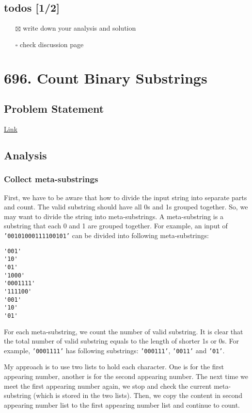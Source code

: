 \documentclass[12pt]{article}
\begin{document}
\subsection{todos [1/2]}
\label{sec:org0171e61}
\begin{itemize}
\item[{$\boxtimes$}] write down your analysis and solution
\item[{$\square$}] check discussion page
\end{itemize}
\section{696. Count Binary Substrings}
\label{sec:org111fe0c}
\subsection{Problem Statement}
\label{sec:org691ab64}
\href{https://leetcode.com/problems/count-binary-substrings/}{Link}
\subsection{Analysis}
\label{sec:org3d0f10a}
\subsubsection{Collect meta-substrings \label{org197fbc5}}
\label{sec:org6eb9aa0}
First, we have to be aware that how to divide the input string into separate parts and count. The valid substring should have all 0s and 1s grouped together. So, we may want to divide the string into meta-substrings. A meta-substring is a substring that each 0 and 1 are grouped together. For example, an input of \texttt{'00101000111100101'} can be divided into following meta-substrings:
\begin{verbatim}
'001'
'10'
'01'
'1000'
'0001111'
'111100'
'001'
'10'
'01'
\end{verbatim}
For each meta-substring, we count the number of valid substring. It is clear that the total number of valid substring equals to the length of shorter 1s or 0s. For example, \texttt{'0001111'} has following substrings: \texttt{'000111'}, \texttt{'0011'} and \texttt{'01'}.

My approach is to use two lists to hold each character. One is for the first appearing number, another is for the second appearing number. The next time we meet the first appearing number again, we stop and check the current meta-substring (which is stored in the two lists). Then, we copy the content in second appearing number list to the first appearing number list and continue to count.
\end{document}
